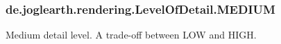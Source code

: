 \subsubsection[{M\-E\-D\-I\-U\-M}]{\setlength{\rightskip}{0pt plus 5cm}de.\-joglearth.\-rendering.\-Level\-Of\-Detail.\-M\-E\-D\-I\-U\-M}\label{enumde_1_1joglearth_1_1rendering_1_1_level_of_detail_a7f393f63040837c1cbdb72702734af23}
Medium detail level. A trade-\/off between {\ttfamily L\-O\-W} and {\ttfamily H\-I\-G\-H}. 